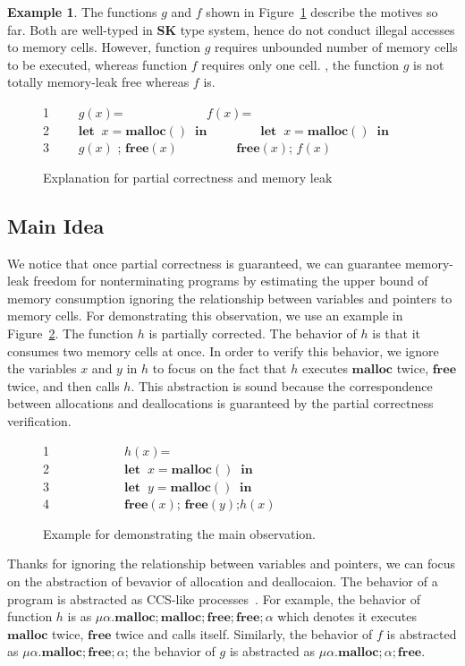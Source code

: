 \documentclass[english]{jssst_ppl} %
\newcommand\LET{\mathbf{let}\;}
\newcommand\IN{\mathbf{in}\;}
\newcommand\Rtab{\; \; \; \;}
\newcommand\MALLOC{\mathbf{malloc()}\;}
\newcommand\Malloc{\mathbf{malloc}}
\newcommand\Free{\mathbf{free}}
\newcommand\Cirx{(x)}
\newcommand\dtb{\;\;\ \;\;\ \;\;\ \;\;\  }
\theoremstyle{definition}
\newtheorem{exmp}{Example}[section]
\begin{document}
\begin{exmp}
The functions $g$ and $f$ shown in Figure~\ref{example:pam} describe the motives so far. Both are well-typed in \textbf{SK} type system, hence do not conduct illegal accesses to memory cells. However, function $g$ requires unbounded number of memory cells to be executed, whereas function $f$ requires only one cell. , the function $g$ is not totally memory-leak free whereas $f$ is.
\begin{figure}[h]
1 \dtb $g(x)$= \dtb\dtb\dtb\Rtab\;\;$f(x)$=  \\
2 \dtb $\LET \; x = \MALLOC  \; \IN$\dtb\dtb$\LET \; x = \MALLOC  \; \IN$\\
3 \dtb $g(x)$ ; \; $\Free\Cirx$ \dtb\dtb\Rtab\;\;$\Free\Cirx$; \; $f(x)$
\caption{Explanation for partial correctness and memory leak}
\label{example:pam}
\end{figure}
\end{exmp}

\subsection{Main Idea}
\label{sec: maino}
We notice that once partial correctness is guaranteed, we can guarantee memory-leak freedom for nonterminating programs by estimating the upper bound of memory consumption ignoring the relationship between variables and pointers to memory cells. For demonstrating this observation, we use an example in Figure~\ref{ex:observation}. The function $h$ is partially corrected. The behavior of $h$ is that it consumes two memory cells at once. In order to verify this behavior, we ignore the variables $x$ and $y$ in $h$ to focus on the fact that $h$ executes $\Malloc$ twice, $\Free$ twice, and then calls $h$. This abstraction is sound because the correspondence between allocations and deallocations is guaranteed by the partial correctness verification.
\begin{figure}[h]
1\dtb \dtb \dtb $h(x)$=\\
2\dtb \dtb \dtb $\LET \; x = \MALLOC  \; \IN$\\
3\dtb \dtb \dtb $\LET \; y = \MALLOC  \; \IN$\\
4\dtb \dtb \dtb $\Free\Cirx$; $\Free(y) $;\;$h(x)$
\caption{Example for demonstrating the main observation.}
\label{ex:observation}
\end{figure}

Thanks for ignoring the relationship between variables and pointers, we can focus on the abstraction of bevavior of allocation and deallocaion. The behavior of a program is abstracted as CCS-like processes~\cite{DBLP:journals/iandc/MilnerPW92a}. For example, the behavior of function $h$ is as $\mu \alpha. \Malloc;\Malloc;\Free;\Free;\alpha$ which denotes it executes $\Malloc$ twice, $\Free$ twice and calls itself. Similarly, the behavior of $f$ is abstracted as $\mu \alpha. \Malloc;\Free;\alpha$; the behavior of $g$ is abstracted as $\mu \alpha. \Malloc;\alpha;\Free$. 
\end{document}
